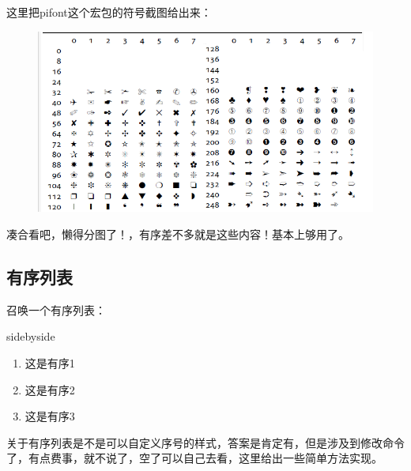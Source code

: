 \documentclass[cn,chinese,color=cyan]{elegantbook}
\begin{document}
这里把pifont这个宏包的符号截图给出来：
\begin{figure}[H]
	\centering
	\includegraphics[width=0.9\linewidth]{figure/00123}
\end{figure}
\begin{note}
	凑合看吧，懒得分图了！，有序差不多就是这些内容！基本上够用了。
\end{note}


\subsection{有序列表}
召唤一个有序列表：
\begin{tcblisting}{sidebyside}
\begin{enumerate}
\item 这是有序1
\item 这是有序2
\item 这是有序3
\end{enumerate}
\end{tcblisting}

\begin{note}
	关于有序列表是不是可以自定义序号的样式，答案是肯定有，但是涉及到修改命令了，有点费事，就不说了，空了可以自己去看，这里给出一些简单方法实现。
\end{note}
\end{document}
